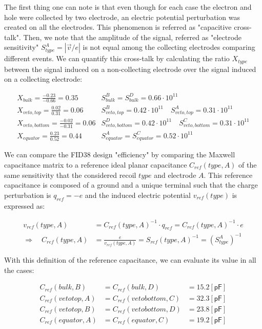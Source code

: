 The first thing one can note is that even though for each case the electron and hole were collected by two electrode, an electric potential perturbation was created on all the electrodes. This phenomenon is referred as "capacitive cross-talk". Then, we note that the amplitude of the signal, referred as "electrode sensitivity" $S_{type}^{A} = |\vec{v}/e|$ is not equal among the collecting electrodes comparing different events. We can quantify this cross-talk by calculating the ratio $X_{type}$ between the signal induced on a non-collecting electrode over the signal induced on a collecting electrode:

\begin{equation}
\begin{array}{cc}
X_{bulk} = \frac{-0.23}{-0.66} = 0.35 & S_{bulk}^{B} = S_{bulk}^{D} = 0.66 \cdot 10^{11}
\\
X_{veto,top} = \frac{0.02}{0.31} = 0.06 & S_{veto,top}^{B} = 0.42 \cdot 10^{11} \quad S_{veto,top}^{A} = 0.31 \cdot 10^{11}
\\
X_{veto,bottom} = \frac{-0.02}{-0.31} = 0.06 & S_{veto,bottom}^{D} = 0.42 \cdot 10^{11} \quad S_{veto,bottom}^{C} = 0.31 \cdot 10^{11}
\\
X_{equator} = \frac{0.23}{0.52} = 0.44 & S_{equator}^{A} = S_{equator}^{C} = 0.52 \cdot 10^{11}
\end{array}
\end{equation}

We can compare the FID38 design "efficiency" by comparing the Maxwell capacitance matrix to a reference ideal planar capacitance $C_{ref}(type, A)$ of the same sensitivity that the considered recoil $type$ and electrode $A$. This reference capacitance is composed of a ground and a unique terminal such that the charge perturbation is $q_{ref}=-e$ and the induced electric potential $v_{ref}(type)$ is expressed as:

\begin{align}
v_{ref}(type, A) &= C_{ref}(type, A)^{-1} \cdot q_{ref} = C_{ref}(type, A)^{-1} \cdot e
\\ \Rightarrow \quad
C_{ref}(type,A) &= \frac{e}{v_{ref}(type,A)} = S_{ref}(type, A)^{-1} = (S_{type}^A)^{-1}
\end{align}

With this definition of the reference capacitance, we can evaluate its value in all the cases:

\begin{equation}
\begin{array}{llr}
C_{ref}(bulk, B) &= C_{ref}(bulk, D) &= 15.2 [\textsf{pF}] \\
C_{ref}(veto top, A) &= C_{ref}(veto bottom, C) &= 32.3 [\textsf{pF}] \\
C_{ref}(veto top, B) &= C_{ref}(veto bottom, D) &= 23.8 [\textsf{pF}] \\
C_{ref}(equator, A) &= C_{ref}(equator, C) &= 19.2 [\textsf{pF}] \\
\end{array}
\end{equation}

